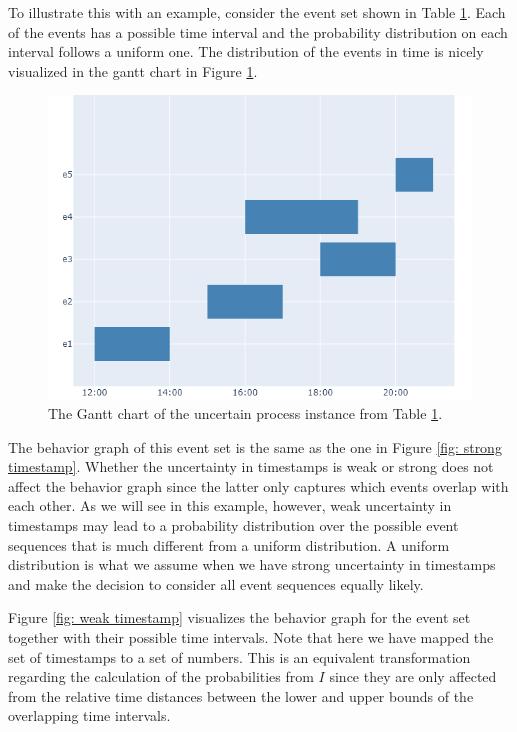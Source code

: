 \begin{itemize}
\begin{table}[h]
\begin{tabular}{ccc}
	\end{tabular}
	\label{table: weak timestamps}
\end{table} 
%
%
%

To illustrate this with an example, consider the event set shown in Table \ref{table: weak timestamps}.
Each of the events has a possible time interval and the probability distribution on each interval follows a uniform one.
The distribution of the events in time is nicely visualized in the gantt chart in Figure \ref{fig: gantt}. 
%
%
%
\begin{figure}
	\centering
	\includegraphics[width=0.8\columnwidth]{figures/gantt_thesis.png}
	\caption{The Gantt chart of the uncertain process instance from Table \ref{table: weak timestamps}.}
	\label{fig: gantt}
\end{figure}
%
%
%
The behavior graph of this event set is the same as the one in Figure \ref{fig: strong timestamp}.
Whether the uncertainty in timestamps is weak or strong does not affect the behavior graph since the latter only captures which events overlap with each other.
As we will see in this example, however, weak uncertainty in timestamps may lead to a probability distribution over the possible event sequences that is much different from a uniform distribution.
A uniform distribution is what we assume when we have strong uncertainty in timestamps and make the decision to consider all event sequences equally likely.

Figure \ref{fig: weak timestamp} visualizes the behavior graph for the event set together with their possible time intervals.
Note that here we have mapped the set of timestamps to a set of numbers.
This is an equivalent transformation regarding the calculation of the probabilities from $I$ since they are only affected from the relative time distances between the lower and upper bounds of the overlapping time intervals.
%
%
%
\begin{figure}[h] 
\centering


\end{figure}
\end{itemize}
